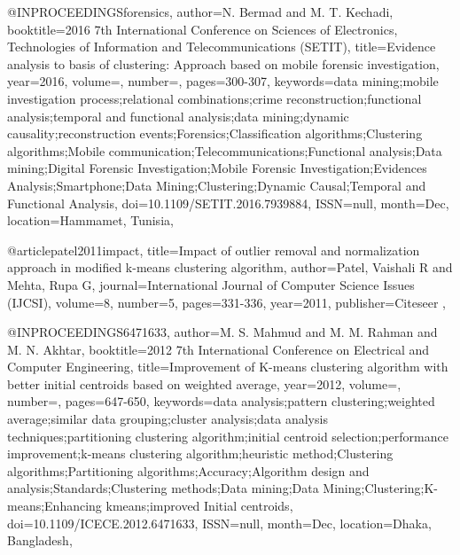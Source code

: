 @INPROCEEDINGS{forensics, 
author={N. {Bermad} and M. T. {Kechadi}}, 
booktitle={2016 7th International Conference on Sciences of Electronics, Technologies of Information and Telecommunications (SETIT)}, 
title={Evidence analysis to basis of clustering: Approach based on mobile forensic investigation}, 
year={2016}, 
volume={}, 
number={}, 
pages={300-307}, 
keywords={data mining;mobile investigation process;relational combinations;crime reconstruction;functional analysis;temporal and functional analysis;data mining;dynamic causality;reconstruction events;Forensics;Classification algorithms;Clustering algorithms;Mobile communication;Telecommunications;Functional analysis;Data mining;Digital Forensic Investigation;Mobile Forensic Investigation;Evidences Analysis;Smartphone;Data Mining;Clustering;Dynamic Causal;Temporal and Functional Analysis}, 
doi={10.1109/SETIT.2016.7939884}, 
ISSN={null}, 
month={Dec},
location={Hammamet, Tunisia}},

@article{patel2011impact,
  title={Impact of outlier removal and normalization approach in modified k-means clustering algorithm},
  author={Patel, Vaishali R and Mehta, Rupa G},
  journal={International Journal of Computer Science Issues (IJCSI)},
  volume={8},
  number={5},
  pages={331-336},
  year={2011},
  publisher={Citeseer}
},

@INPROCEEDINGS{6471633, 
author={M. S. {Mahmud} and M. M. {Rahman} and M. N. {Akhtar}}, 
booktitle={2012 7th International Conference on Electrical and Computer Engineering}, 
title={Improvement of K-means clustering algorithm with better initial centroids based on weighted average}, 
year={2012}, 
volume={}, 
number={}, 
pages={647-650}, 
keywords={data analysis;pattern clustering;weighted average;similar data grouping;cluster analysis;data analysis techniques;partitioning clustering algorithm;initial centroid selection;performance improvement;k-means clustering algorithm;heuristic method;Clustering algorithms;Partitioning algorithms;Accuracy;Algorithm design and analysis;Standards;Clustering methods;Data mining;Data Mining;Clustering;K-means;Enhancing kmeans;improved Initial centroids}, 
doi={10.1109/ICECE.2012.6471633}, 
ISSN={null}, 
month={Dec},
location={Dhaka, Bangladesh}},

